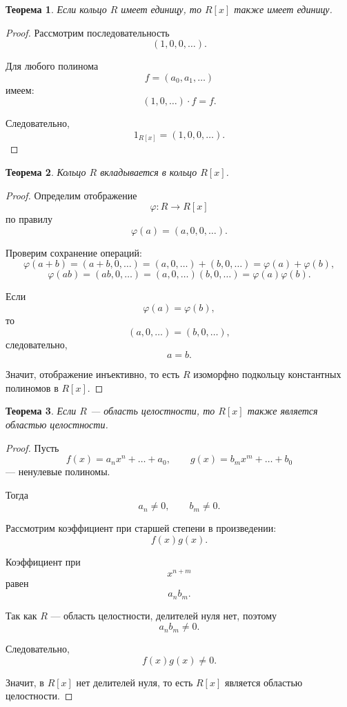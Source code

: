 \documentclass[12pt, a4paper]{article}
\newtheorem{theorem}{Теорема}
\theoremstyle{definition}
\theoremstyle{remark}
\begin{document}
\begin{theorem}
	Если кольцо $R$ имеет единицу, то $R[x]$ также имеет единицу.
\end{theorem}

\begin{proof}
	Рассмотрим последовательность
	\[
	(1,0,0,\dots).
	\]
	
	Для любого полинома
	\[
	f=(a_0,a_1,\dots)
	\]
	имеем:
	\[
	(1,0,\dots)\cdot f=f.
	\]
	
	Следовательно,
	\[
	1_{R[x]}=(1,0,0,\dots).
	\]
\end{proof}

\begin{theorem}
	Кольцо $R$ вкладывается в кольцо $R[x]$.
\end{theorem}

\begin{proof}
	Определим отображение
	\[
	\varphi:R\to R[x]
	\]
	по правилу
	\[
	\varphi(a)=(a,0,0,\dots).
	\]
	
	Проверим сохранение операций:
	\[
	\varphi(a+b)
	=
	(a+b,0,\dots)
	=
	(a,0,\dots)+(b,0,\dots)
	=
	\varphi(a)+\varphi(b),
	\]
	\[
	\varphi(ab)
	=
	(ab,0,\dots)
	=
	(a,0,\dots)(b,0,\dots)
	=
	\varphi(a)\varphi(b).
	\]
	
	Если
	\[
	\varphi(a)=\varphi(b),
	\]
	то
	\[
	(a,0,\dots)=(b,0,\dots),
	\]
	следовательно,
	\[
	a=b.
	\]
	
	Значит, отображение инъективно, то есть $R$ изоморфно
	подкольцу константных полиномов в $R[x]$.
\end{proof}

\begin{theorem}
	Если $R$ --- область целостности, то $R[x]$ также является областью целостности.
\end{theorem}

\begin{proof}
	Пусть
	\[
	f(x)=a_nx^n+\dots+a_0,
	\qquad
	g(x)=b_mx^m+\dots+b_0
	\]
	--- ненулевые полиномы.
	
	Тогда
	\[
	a_n\ne0,
	\qquad
	b_m\ne0.
	\]
	
	Рассмотрим коэффициент при старшей степени в произведении:
	\[
	f(x)g(x).
	\]
	
	Коэффициент при
	\[
	x^{n+m}
	\]
	равен
	\[
	a_n b_m.
	\]
	
	Так как $R$ --- область целостности, делителей нуля нет, поэтому
	\[
	a_n b_m\ne0.
	\]
	
	Следовательно,
	\[
	f(x)g(x)\ne0.
	\]
	
	Значит, в $R[x]$ нет делителей нуля, то есть $R[x]$
	является областью целостности.
\end{proof}
\end{document}

